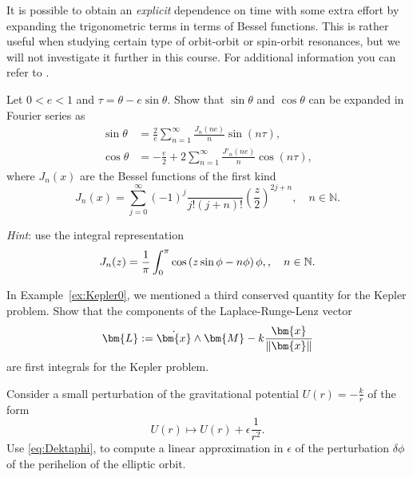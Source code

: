 \documentclass[english,fontsize=11pt,paper=a5,oneside]{scrbook}
\newcommand{\N}{\mathbb{N}}
\newcommand{\bx}{\bm{x}}
\let\d\relax
\newcommand{\d}{\mathrm{d}}
\theoremstyle{definition}
\newenvironment{exercise}
  {\pushQED{\qed}\renewcommand{\qedsymbol}{$\maltese$}\exercisex}
  {\popQED\endexercisex}
\begin{document}
It is possible to obtain an \emph{explicit} dependence on time with some extra effort by expanding the trigonometric terms in terms of Bessel functions. This is rather useful when studying certain type of orbit-orbit or spin-orbit resonances, but we will not investigate it further in this course. For additional information you can refer to \cite{book:arnoldcelestial, book:celletti}.

\begin{exercise}
  Let $0<e<1$ and $\tau = \theta - e\sin\theta$.
  Show that $\sin\theta$ and $\cos\theta$ can be expanded in Fourier series as
  \begin{align}
    \sin\theta & = \frac2e \sum_{n=1}^\infty \frac{J_n(ne)}{n} \sin(n\tau),        \\
    \cos\theta & = -\frac e2 + 2 \sum_{n=1}^\infty \frac{J'_n(ne)}{n} \cos(n\tau),
  \end{align}
  where $J_n(x)$ are the Bessel functions of the first kind
  \begin{equation}
    J_n(x) = \sum_{j=0}^\infty (-1)^j\frac{}{j!(j+n)!}\left(\frac z2\right)^{2j+n}, \quad n\in\N.
  \end{equation}

  \emph{Hint}: use the integral representation
  \begin{equation}
    J_n(z) = \frac1\pi \int_0^\pi \cos\left(z\sin\phi - n \phi\right)\d\phi,, \quad n\in\N.
  \end{equation}
\end{exercise}

In Example~\ref{ex:Kepler0}, we mentioned a third conserved quantity for the Kepler problem.
\begin{exercise}
  Show that the components of the Laplace-Runge-Lenz vector
  \begin{equation}
    \bm{L} := \dot \bx\wedge \bm{M} - k \frac{\bx}{\|\bx\|}
  \end{equation}
  are first integrals for the Kepler problem.
\end{exercise}

\begin{exercise}
  Consider a small perturbation of the gravitational potential $U(r) = -\frac kr$ of the form
  \begin{equation}
    U(r) \mapsto U(r) + \epsilon \frac 1{r^2}.
  \end{equation}
  Use \eqref{eq:Dektaphi}, to compute a linear approximation in $\epsilon$ of the perturbation $\delta \phi$ of the perihelion of the elliptic orbit.
\end{exercise}
\end{document}
